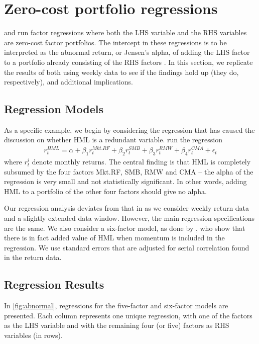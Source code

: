 
\section{Zero-cost portfolio regressions}
\label{sec:alpha_reg}
\textcite{FF2015} and \textcite{Asness2015} run factor regressions where both the LHS variable and the RHS variables are zero-cost factor portfolios. The intercept in these regressions is to be interpreted as the abnormal return, or Jensen's alpha, of adding the LHS factor to a portfolio already consisting of the RHS factors \autocite{Jensen1968}. In this section, we replicate the results of both using weekly data to see if the findings hold up (they do, respectively), and additional implications.

\subsection{Regression Models}

As a specific example, we begin by considering the regression that has caused the discussion on whether HML is a redundant variable. \textcite{FF2015} run the regression
\begin{align}
  r^{HML}_t = \alpha + \beta_1 r^{Mkt.RF}_t + \beta_2 r^{SMB}_t + \beta_3 r^{RMW}_t + \beta_4 r^{CMA}_t + \epsilon_t
\end{align}
where $r^i_t$ denote monthly returns. The central finding is that HML is completely subsumed by the four factors Mkt.RF, SMB, RMW and CMA -- the alpha of the regression is very small and not statistically significant. In other words, adding HML to a portfolio of the other four factors should give no alpha.

Our regression analysis deviates from that in \textcite{FF2015} as we consider weekly return data and a slightly extended data window. However, the main regression specifications are the same. We also consider a six-factor model, as done by \textcite{Asness2015}, who show that there is in fact added value of HML when momentum is included in the regression. We use standard errors that are adjusted for serial correlation found in the return data.

\subsection{Regression Results}

In \autoref{fig:abnormal}, regressions for the five-factor and six-factor models are presented. Each column represents one unique regression, with one of the factors as the LHS variable and with the remaining four (or five) factors as RHS variables (in rows).

